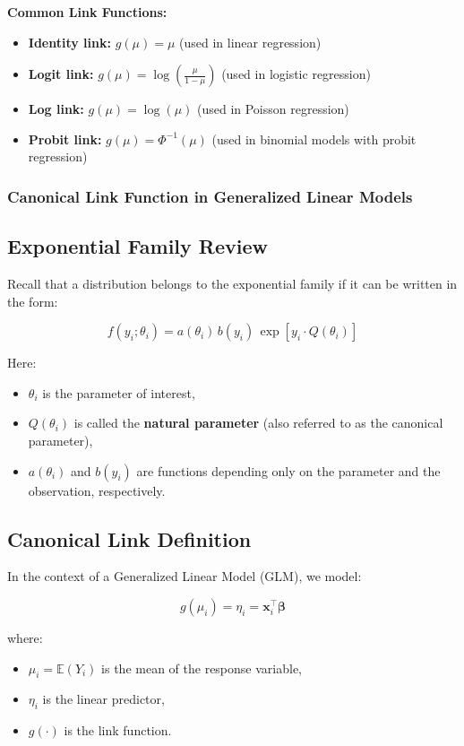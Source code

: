 \documentclass[12pt,a4paper]{article}
\begin{document}
  \textbf{Common Link Functions:}
  \begin{itemize}
    \item \textbf{Identity link:} \( g(\mu) = \mu \) \quad (used in linear regression)
    \item \textbf{Logit link:} \( g(\mu) = \log\left( \frac{\mu}{1 - \mu} \right) \) \quad (used in logistic regression)
    \item \textbf{Log link:} \( g(\mu) = \log(\mu) \) \quad (used in Poisson regression)
    \item \textbf{Probit link:} \( g(\mu) = \Phi^{-1}(\mu) \) \quad (used in binomial models with probit regression)
  \end{itemize}


\subsubsection{Canonical Link Function in Generalized Linear Models}

\subsection*{Exponential Family Review}

Recall that a distribution belongs to the exponential family if it can be written in the form:

\[
f(y_i; \theta_i) = a(\theta_i) \, b(y_i) \, \exp\left[ y_i \cdot Q(\theta_i) \right]
\]

Here:
\begin{itemize}
  \item \( \theta_i \) is the parameter of interest,
  \item \( Q(\theta_i) \) is called the \textbf{natural parameter} (also referred to as the canonical parameter),
  \item \( a(\theta_i) \) and \( b(y_i) \) are functions depending only on the parameter and the observation, respectively.
\end{itemize}

\subsection*{Canonical Link Definition}

In the context of a Generalized Linear Model (GLM), we model:

\[
g(\mu_i) = \eta_i = \mathbf{x}_i^\top \boldsymbol{\beta}
\]

where:
\begin{itemize}
  \item \( \mu_i = \mathbb{E}(Y_i) \) is the mean of the response variable,
  \item \( \eta_i \) is the linear predictor,
  \item \( g(\cdot) \) is the link function.
\end{itemize}
\end{document}
